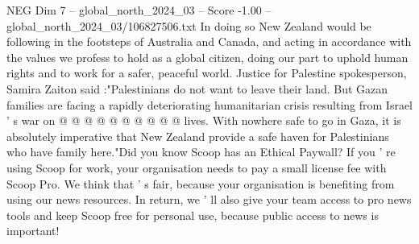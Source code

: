 \begin{textsample}{NEG Dim 7 – global\_north\_2024\_03 – Score -1.00 – global\_north\_2024\_03/106827506.txt}
In doing so New Zealand would be following in the footsteps of Australia and Canada, and acting in accordance with the values we profess to hold as a global citizen, doing our part to uphold human rights and to work for a safer, peaceful world.
Justice for Palestine spokesperson, Samira Zaiton said :"Palestinians do not want to leave their land.
But Gazan families are facing a rapidly deteriorating humanitarian crisis resulting from Israel ' s war on @ @ @ @ @ @ @ @ @ @ lives.
With nowhere safe to go in Gaza, it is absolutely imperative that New Zealand provide a safe haven for Palestinians who have family here."Did you know Scoop has an Ethical Paywall?
If you ' re using Scoop for work, your organisation needs to pay a small license fee with Scoop Pro.
We think that ' s fair, because your organisation is benefiting from using our news resources.
In return, we ' ll also give your team access to pro news tools and keep Scoop free for personal use, because public access to news is important!

\end{textsample}
